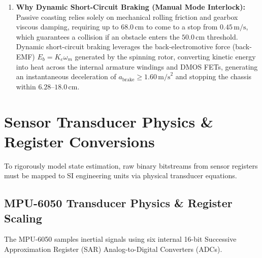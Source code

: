 \documentclass[11pt, a4paper]{article}
\begin{document}
\begin{enumerate}
    \item \textbf{Why Dynamic Short-Circuit Braking (Manual Mode Interlock):} Passive coasting relies solely on mechanical rolling friction and gearbox viscous damping, requiring up to $68.0\,\text{cm}$ to come to a stop from $0.45\,\text{m/s}$, which guarantees a collision if an obstacle enters the $50.0\,\text{cm}$ threshold. Dynamic short-circuit braking leverages the back-electromotive force (back-EMF) $E_b = K_e \omega_m$ generated by the spinning rotor, converting kinetic energy into heat across the internal armature windings and DMOS FETs, generating an instantaneous deceleration of $a_{\text{brake}} \ge 1.60\,\text{m/s}^2$ and stopping the chassis within $6.28\text{--}18.0\,\text{cm}$.
\end{enumerate}

\newpage
\section{Sensor Transducer Physics \& Register Conversions}

To rigorously model state estimation, raw binary bitstreams from sensor registers must be mapped to SI engineering units via physical transducer equations.

\subsection{MPU-6050 Transducer Physics \& Register Scaling}
The MPU-6050 samples inertial signals using six internal 16-bit Successive Approximation Register (SAR) Analog-to-Digital Converters (ADCs).
\end{document}
